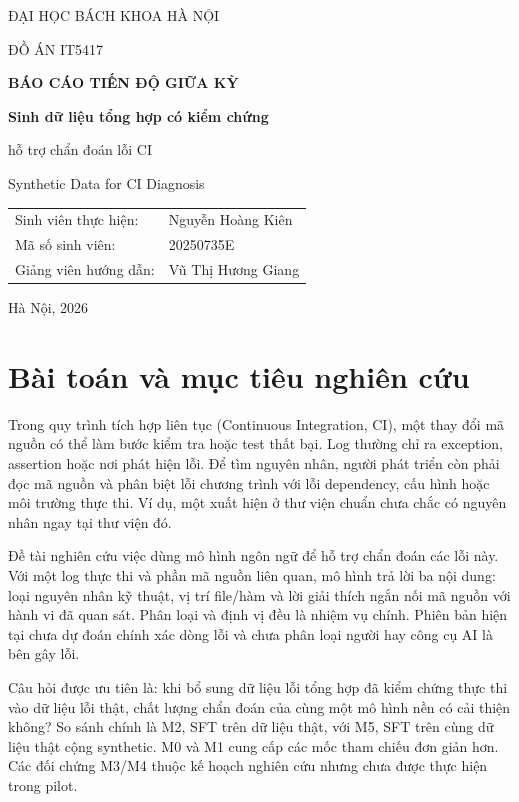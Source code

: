 \documentclass[12pt,a4paper]{article}
\begin{document}
\begin{titlepage}
\centering
{\large ĐẠI HỌC BÁCH KHOA HÀ NỘI\par}
\vspace{1cm}
{\large ĐỒ ÁN IT5417\par}
\vspace{1.6cm}
{\LARGE\bfseries BÁO CÁO TIẾN ĐỘ GIỮA KỲ\par}
\vspace{1cm}
{\Large\bfseries Sinh dữ liệu tổng hợp có kiểm chứng\par hỗ trợ chẩn đoán lỗi CI\par}
\vspace{.7cm}
{\large Synthetic Data for CI Diagnosis\par}
\vfill
\begin{tabular}{ll}
Sinh viên thực hiện: & Nguyễn Hoàng Kiên\\[.35cm]
Mã số sinh viên: & 20250735E\\[.35cm]
Giảng viên hướng dẫn: & Vũ Thị Hương Giang
\end{tabular}
\vfill
{Hà Nội, 2026\par}
\end{titlepage}
\tableofcontents
\clearpage{}

\section{Bài toán và mục tiêu nghiên cứu}
Trong quy trình tích hợp liên tục (Continuous Integration, CI), một thay đổi mã nguồn có thể làm bước kiểm tra hoặc test thất bại. Log thường chỉ ra exception, assertion hoặc nơi phát hiện lỗi. Để tìm nguyên nhân, người phát triển còn phải đọc mã nguồn và phân biệt lỗi chương trình với lỗi dependency, cấu hình hoặc môi trường thực thi. Ví dụ, một  xuất hiện ở thư viện chuẩn chưa chắc có nguyên nhân ngay tại thư viện đó.

Đề tài nghiên cứu việc dùng mô hình ngôn ngữ để hỗ trợ chẩn đoán các lỗi này. Với một log thực thi và phần mã nguồn liên quan, mô hình trả lời ba nội dung: loại nguyên nhân kỹ thuật, vị trí file/hàm và lời giải thích ngắn nối mã nguồn với hành vi đã quan sát. Phân loại và định vị đều là nhiệm vụ chính. Phiên bản hiện tại chưa dự đoán chính xác dòng lỗi và chưa phân loại người hay công cụ AI là bên gây lỗi.

Câu hỏi được ưu tiên là: khi bổ sung dữ liệu lỗi tổng hợp đã kiểm chứng thực thi vào dữ liệu lỗi thật, chất lượng chẩn đoán của cùng một mô hình nền có cải thiện không? So sánh chính là M2, SFT trên dữ liệu thật, với M5, SFT trên cùng dữ liệu thật cộng synthetic. M0 và M1 cung cấp các mốc tham chiếu đơn giản hơn. Các đối chứng M3/M4 thuộc kế hoạch nghiên cứu nhưng chưa được thực hiện trong pilot.
\end{document}

